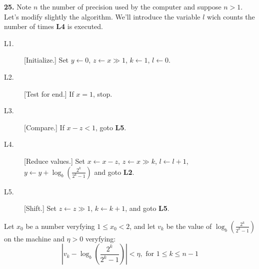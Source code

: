 \documentclass[a4paper,12pt]{article}
\newcommand{\newpar}[1]{\bigskip \noindent \textbf{#1.}}
\newcommand{\la}{\leftarrow}
\begin{document}
\newpar{25} Note $n$ the number of precision used by the computer and suppose
$n > 1$.\\
Let's modify slightly the algorithm. We'll introduce the variable $l$ wich
counts the number of times \textbf{L4} is executed.
\begin{description}
\item[L1.]
[Initialize.] Set $y \la 0$, $z \la x \gg 1$,
$k \la 1$, $l \la 0$.
\item[L2.]
[Test for end.] If $x = 1$, stop.
\item[L3.]
[Compare.] If $x - z < 1$, goto \textbf{L5}.
\item[L4.]
[Reduce values.] Set $x \la x-z$, $z \la x \gg k$,
$l \la l+1$,
$y \la y + \log_b\left(\frac{2^k}{2^k-1}\right)$ and goto \textbf{L2}.
\item[L5.]
[Shift.] Set $z \la z \gg 1$, $k \la k+1$, and goto \textbf{L5}.
\end{description}

\noindent 
Let $x_0$ be a number veryfying $1 \le x_0 < 2$, and let $v_k$ be the value of 
$\log_b\left(\frac{2^k}{2^k-1}\right)$ on the machine and  $\eta > 0$ veryfying:
\[ \left|v_k - \log_b\left(\frac{2^k}{2^k-1}\right)\right| < \eta,
\mbox{ for } 1 \le k \le n-1 \]
\end{document}
